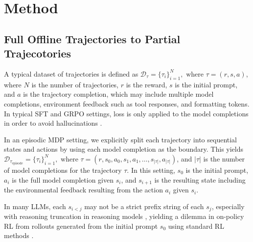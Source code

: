 \section{Method}
\label{sec:method}

\subsection{Full Offline Trajectories to Partial Trajecotories}

A typical dataset of trajectories is defined as $\mathcal{D}_{\tau} = \{ \tau_i \}_{i=1}^N, \text { where } \tau = (r, s, a)$, where $N$ is the number of trajectories, $r$ is the reward, $s$ is the initial prompt, and $a$ is the trajectory completion, which may include multiple model completions, environment feedback such as tool responses, and formatting tokens. In typical SFT and GRPO settings, loss is only applied to the model completions in order to avoid hallucinations .

In an episodic MDP setting, we explicitly split each trajectory into sequential states and actions by using each model completion as the boundary. This yields $\mathcal{D}_{\tau_\text{episode}} = \{ \tau_i \}_{i=1}^N, \text{ where } \tau = (r, s_0, a_0, s_1, a_1, \dots, s_{|\tau|}, a_{|\tau|})$, and $|\tau|$ is the number of model completions for the trajectory $\tau$. In this setting, $s_0$ is the initial prompt, $a_i$ is the full model completion given $s_i$, and $s_{i+1}$ is the resulting state including the environmental feedback resulting from the action $a_i$ given $s_i$.

In many LLMs, each $s_{i<j}$ may not be a strict prefix string of each $s_j$, especially with reasoning truncation in reasoning models \citep{qwen3technicalreport,deepseekai2025deepseekv32pushingfrontieropen,kimiteam2025kimik2openagentic}, yielding a dilemma in on-policy RL from rollouts generated from the initial prompt $s_0$ using standard RL methods .

